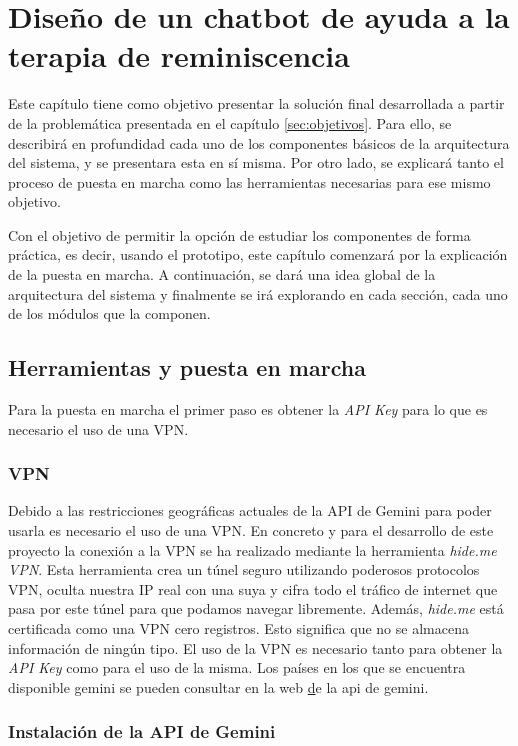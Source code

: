 \chapter{Diseño de un chatbot de ayuda a la terapia de reminiscencia}
\label{cap:ChatBot final}
Este capítulo tiene como objetivo presentar la solución final desarrollada a partir de la problemática presentada en el capítulo \ref{sec:objetivos}. Para ello, se describirá en profundidad cada uno de los componentes básicos de la arquitectura del sistema, y se presentara esta en sí misma. Por otro lado, se explicará tanto el proceso de puesta en marcha como las herramientas necesarias para ese mismo objetivo. 

Con el objetivo de permitir la opción de estudiar los componentes de forma práctica, es decir, usando el prototipo, este capítulo comenzará por la explicación de la puesta en marcha. A continuación, se dará una idea global de la arquitectura del sistema y finalmente se irá explorando en cada sección, cada uno de los módulos que la componen. 
\section{Herramientas y puesta en marcha}
Para la puesta en marcha el primer paso es obtener la \textit{API Key} para lo que es necesario el uso de una VPN.
\subsection{VPN}
Debido a las restricciones geográficas actuales de la API de Gemini para poder usarla es necesario el uso de una VPN. En concreto y para el desarrollo de este proyecto la conexión a la VPN se ha realizado mediante la herramienta \textit{hide.me VPN}. Esta herramienta crea un túnel seguro utilizando poderosos protocolos VPN, oculta nuestra IP real con una suya y cifra todo el tráfico de internet que pasa por este túnel para que podamos navegar libremente. Además, \textit{hide.me} está certificada como una VPN cero registros. Esto significa que no se almacena información de ningún tipo. El uso de la VPN es necesario tanto para obtener la \textit{API Key} como para el uso de la misma. Los países en los que se encuentra disponible gemini se pueden consultar en la web \href{https://ai.google.dev/gemini-api/docs/available-regions?hl=es-419} de la api de gemini. 

\subsection{Instalación de la API de Gemini}

